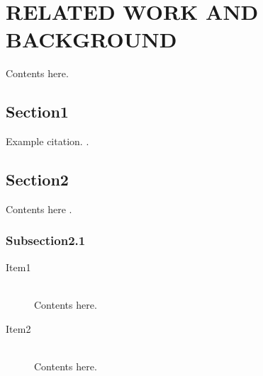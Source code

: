 \chapter {RELATED WORK AND BACKGROUND}
\label {chp:relatedworks}

Contents here.

\section {Section1}
Example citation. \cite{RyanDeci2000bSDT}. 

\section {Section2}
Contents here \cite{RyanRigby2011glued, Baldwin2014DynamicDifficulty, NPD2014Report, Quick2013ModelingEnjoyment, Dennie2012AutonomyMotivation, Ryan2000Rewards, McNamara2010PointsFeedback, unityGame}.

\subsection {Subsection2.1}
\begin{description}
\item[Item1] \hfill \\
Contents here.

\item[Item2] \hfill \\
Contents here. 
\end{description}